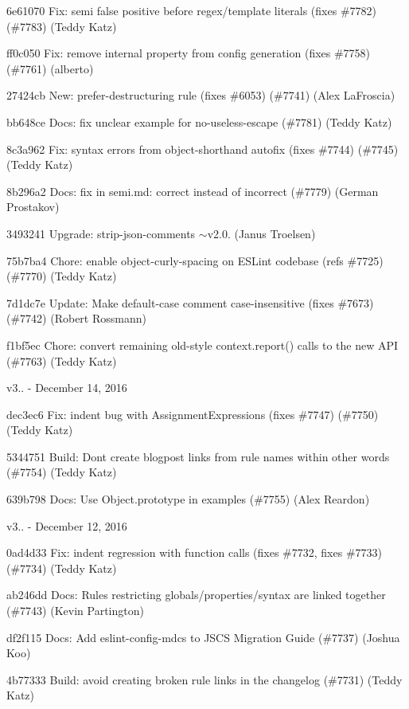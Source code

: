 \begin{DoxyItemize}
\item 6e61070 Fix\+: {\ttfamily semi} false positive before regex/template literals (fixes \#7782) (\#7783) (Teddy Katz)
\item ff0c050 Fix\+: remove internal property from config generation (fixes \#7758) (\#7761) (alberto)
\item 27424cb New\+: {\ttfamily prefer-\/destructuring} rule (fixes \#6053) (\#7741) (Alex La\+Froscia)
\item bb648ce Docs\+: fix unclear example for no-\/useless-\/escape (\#7781) (Teddy Katz)
\item 8c3a962 Fix\+: syntax errors from object-\/shorthand autofix (fixes \#7744) (\#7745) (Teddy Katz)
\item 8b296a2 Docs\+: fix in semi.\+md\+: correct instead of incorrect (\#7779) (German Prostakov)
\item 3493241 Upgrade\+: strip-\/json-\/comments \texorpdfstring{$\sim$}{\string~}v2.0. (Janus Troelsen)
\item 75b7ba4 Chore\+: enable object-\/curly-\/spacing on ESLint codebase (refs \#7725) (\#7770) (Teddy Katz)
\item 7d1dc7e Update\+: Make default-\/case comment case-\/insensitive (fixes \#7673) (\#7742) (Robert Rossmann)
\item f1bf5ec Chore\+: convert remaining old-\/style context.\+report() calls to the new API (\#7763) (Teddy Katz)
\end{DoxyItemize}

v3.. -\/ December 14, 2016


\begin{DoxyItemize}
\item dec3ec6 Fix\+: indent bug with Assignment\+Expressions (fixes \#7747) (\#7750) (Teddy Katz)
\item 5344751 Build\+: Don\textquotesingle{}t create blogpost links from rule names within other words (\#7754) (Teddy Katz)
\item 639b798 Docs\+: Use {\ttfamily Object.\+prototype} in examples (\#7755) (Alex Reardon)
\end{DoxyItemize}

v3.. -\/ December 12, 2016


\begin{DoxyItemize}
\item 0ad4d33 Fix\+: {\ttfamily indent} regression with function calls (fixes \#7732, fixes \#7733) (\#7734) (Teddy Katz)
\item ab246dd Docs\+: Rules restricting globals/properties/syntax are linked together (\#7743) (Kevin Partington)
\item df2f115 Docs\+: Add eslint-\/config-\/mdcs to JSCS Migration Guide (\#7737) (Joshua Koo)
\item 4b77333 Build\+: avoid creating broken rule links in the changelog (\#7731) (Teddy Katz)
\end{DoxyItemize}


